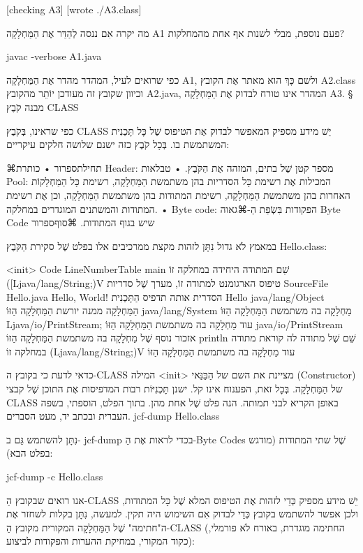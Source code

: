 [checking A3]
[wrote ./A3.class]

מה יקרה אִם ננסה לְהַדֵּר אֶת הַמַּחְלָקָה A1 פעם נוספת, מבלי לשנות אף אחת
מהמחלקות?

javac -verbose A1.java
\END

כפי שרואים לעיל, המהדר מהדר אֶת הַמַּחְלָקָה A1, ולשם כָּךְ הוא מאתר אֶת הקובץ
A2.class וכיוון שקובץ זה מעודכן יוֹתֵר מהקובץ A2.java, המהדר אינו טורח לבדוק אֶת
הַמַּחְלָקָה A3.
§ מבנה קֹבֶץ CLASS

כפי שראינו, בְּקֹבֶץ CLASS יֵשׁ מידע מספיק המאפשר לבדוק אֶת הטיפוס שֶׁל כָּל
תָּכְנִית המשתמשת בו. בְּכָל קֹבֶץ כזה ישנם שלושה חלקים עיקריים:

⌘תחילת{ספרור}
• כותרת Header: מספר קטן שֶׁל בתים, המזהה אֶת הַקֹּבֶץ.
• טבלאות Pool: המכילות אֶת רשימת כָּל הסדריות בהן משתמשת הַמַּחְלָקָה, רשימת
כָּל הַמַּחְלָקוֹת האחרות בהן משתמשת הַמַּחְלָקָה, רשימת המתודות בהן משתמשת
הַמַּחְלָקָה, וכן אֶת רשימת המתודות והמשתנים המוגדרים במחלקה.
• Byte code: הפקודות בִּשְׂפַת הַ-⌘גאוה Byte Code שיש בגוף המתודות.
⌘סוף{ספרור}

במאמץ לֹא גדול נִתָּן לזהות מקצת ממרכיבים אלו בפלט שֶׁל סקירת הַקֹּבֶץ
Hello.class:

<init>
Code
LineNumberTable
main שֵׁם המתודה היחידה במחלקה זוֹ
([Ljava/lang/String;)V טיפוס הארגומנט למתודה זוֹ, מערך שֶׁל
סדריות
SourceFile
Hello.java
Hello, World! הסדרית אותה תדפיס הַתָּכְנִית
Hello
java/lang/Object הַמַּחְלָקָה ממנה יורשת
הַמַּחְלָקָה הַזּוֹ
java/lang/System מַחְלָקָה בה משתמשת הַמַּחְלָקָה
הַזּוֹ
Ljava/io/PrintStream; עוד מַחְלָקָה בה משתמשת הַמַּחְלָקָה
הַזּוֹ
java/io/PrintStream אזכור נוסף שֶׁל מַחְלָקָה בה משתמשת
הַמַּחְלָקָה הַזּוֹ
println שֵׁם שֶׁל מתודה לה קוראת מתודה במחלקה זוֹ
(Ljava/lang/String;)V עוד מַחְלָקָה בה משתמשת הַמַּחְלָקָה
הַזּוֹ

כדאי לדעת כי בקובץ ה-CLASS המילה <init> מציינת את השם של הַבַּנַּאי
(Constructor) של הַמַּחְלָקָה.
בְּכָל זאת, הפענוח אינו קל. ישנן תָּכְנִיּוֹת רבות המדפיסות אֶת התוכן שֶׁל קבצי
CLASS באופן הקריא לבני תמותה. הנה פלט שֶׁל אחת מהן. בתוך הפלט, הוספתי, בשפה
העברית ובכתב יד, מעט הסברים.
jcf-dump Hello.class
\END

נִתָּן להשתמש גַּם ב- jcf-dump בכדי לראות אֶת הַ-Byte Codes שֶׁל שתי המתודות
(מודגש בפלט הבא):

jcf-dump -c Hello.class
\END

אנו רואים שבקובץ הַ-CLASS יֵשׁ מידע מספיק כְּדֵי לזהות אֶת הטיפוס המלא שֶׁל כָּל
המתודות, ולכן אפשר להשתמש בקובץ כְּדֵי לבדוק אִם השימוש היה תקין. למעשה, נִתָּן
בקלות לשחזר אֶת ה"חתימה" שֶׁל הַמַּחְלָקָה המקורית מקובץ הַ-CLASS (החתימה
מוגדרת, באורח לֹא פורמלי, כקוד המקורי, במחיקת ההערות והפקודות לביצוע):

